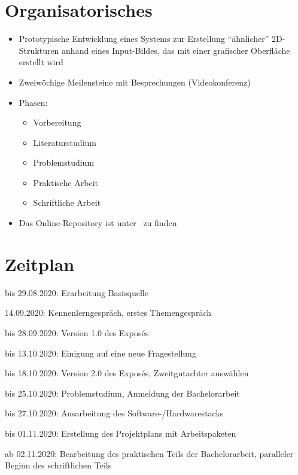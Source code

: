 \documentclass[11pt]{article}
\newcommand{\cmark}{\ding{51}}%
\newcommand{\done}{\rlap{$\square$}{\raisebox{2pt}{\large\hspace{1pt}\cmark}}%
\hspace{-2.5pt}}
\begin{document}
    \newpage

    \begin{itemize}

    \end{itemize}

    \section{Organisatorisches}
    \begin{itemize}
        \item Prototypische Entwicklung eines Systems zur Erstellung "`ähnlicher"' 2D-Strukturen anhand eines
        Input-Bildes, das mit einer grafischer Oberfläche erstellt wird
        \item Zweiwöchige Meilensteine mit Besprechungen (Videokonferenz)
        \item Phasen:
        \begin{itemize}
            \item Vorbereitung
            \item Literaturstudium
            \item Problemstudium
            \item Praktische Arbeit
            \item Schriftliche Arbeit
        \end{itemize}
        \item Das Online-Repository ist unter~\cite{github} zu finden
    \end{itemize}

    \section{Zeitplan}
    \begin{todolist}
        \item[\done] bis 29.08.2020: Erarbeitung Basisquelle
        \item[\done] 14.09.2020: Kennenlerngespräch, erstes Themengespräch
        \item[\done] bis 28.09.2020: Version 1.0 des Exposés
        \item[\done] bis 13.10.2020: Einigung auf eine neue Fragestellung
        \item[\done] bis 18.10.2020: Version 2.0 des Exposés, Zweitgutachter auswählen
        \item bis 25.10.2020: Problemstudium, Anmeldung der Bachelorarbeit
        \item bis 27.10.2020: Ausarbeitung des Software-/Hardwarestacks
        \item bis 01.11.2020: Erstellung des Projektplans mit Arbeitspaketen
        \item ab 02.11.2020: Bearbeitung des praktischen Teils der Bachelorarbeit, paralleler Beginn des schriftlichen
        Teils
    \end{todolist}

    \newpage

    \listoffigures

    
    
\end{document}
